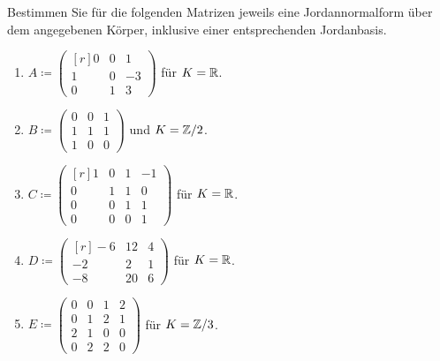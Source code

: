 \documentclass[a4paper, 10pt]{scrartcl}
\begin{document}
\begin{question}
  Bestimmen Sie für die folgenden Matrizen jeweils eine Jordannormalform über dem angegebenen Körper, inklusive einer entsprechenden Jordanbasis.
  \begin{enumerate}
    \item
      $
      A
      \coloneqq
      \begin{pmatrix*}[r]
        0 & 0 &  1  \\
        1 & 0 & -3  \\
        0 & 1 &  3
      \end{pmatrix*}
      $
      für $K = \mathbb{R}$.
    \item
      $
      B
      \coloneqq
      \begin{pmatrix}
        0 & 0 & 1 \\
        1 & 1 & 1 \\
        1 & 0 & 0
      \end{pmatrix}
      $
      und $K = \mathbb{Z}/2$.
    \item
      $
      C
      \coloneqq
      \begin{pmatrix*}[r]
        1 & 0 & 1 & -1  \\
        0 & 1 & 1 &  0  \\
        0 & 0 & 1 &  1  \\
        0 & 0 & 0 &  1
      \end{pmatrix*}
      $
      für $K = \mathbb{R}$.
    \item
      $
      D
      \coloneqq
      \begin{pmatrix*}[r]
        -6 & 12 & 4 \\
        -2 &  2 & 1 \\
        -8 & 20 & 6
      \end{pmatrix*}
      $
      für $K = \mathbb{R}$.
    \item
      $
      E
      \coloneqq
      \begin{pmatrix}
        0 & 0 & 1 & 2 \\
        0 & 1 & 2 & 1 \\
        2 & 1 & 0 & 0 \\
        0 & 2 & 2 & 0
      \end{pmatrix}
      $
      für $K = \mathbb{Z}/3$.
  \end{enumerate}
\end{question}
\end{document}

